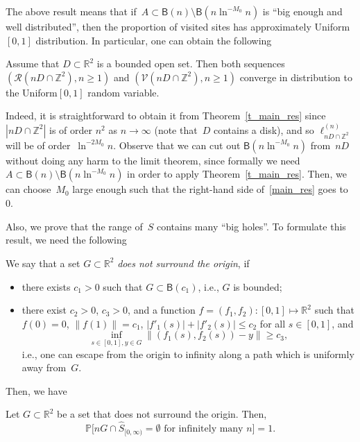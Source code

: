 \documentclass[AHL,Unicode,longabstracts]{cedram}
\newcommand{\1}[1]{{\mathbf 1}{\{#1\}}}
\newcommand{\Z}{\mathbb{Z}}
\newcommand{\V}{{\mathcal V}}
\newcommand{\RR}{{\mathcal R}}
\newcommand{\R}{{\mathbb R}}
\newcommand{\s}{{\widehat S}}
\newcommand{\8}{{\infty}}
\newcommand{\IP}{{\mathbb P}}
\newcommand{\B}{{\mathsf B}}
\begin{document}
The above result means that if~$A\subset \B(n)\setminus \B(n\ln^{-M_0}n)$ is ``big enough and well distributed'', then the proportion of visited sites has approximately Uniform$[0,1]$ distribution. In particular, one can obtain the following

\begin{coro}\label{cor_open}
Assume that $D\subset \R^2$ is a bounded open set. Then both sequences $(\RR(nD\cap\Z^2),n\geq 1)$ and $(\V(nD\cap\Z^2),n\geq 1)$ converge in distribution to the Uniform$[0,1]$ random variable.
\end{coro}

Indeed, it is straightforward to obtain it from Theorem~\ref{t_main_res} since $|nD\cap\Z^2|$ is of order $n^2$ as $n\to\infty$ (note that~$D$ contains a disk), and so $\ell^{(n)}_{nD\cap\Z^2}$ will be of order~$\ln^{-2M_0}n$. Observe that we can cut out $\B(n\ln^{-M_0}n)$ from~$nD$ without doing any harm to the limit theorem, since formally we need $A\subset \B(n)\setminus \B(n\ln^{-M_0}n)$ in order to apply Theorem~\ref{t_main_res}. Then, we can choose~$M_0$ large enough such that the right-hand side of~\eqref{main_res} goes to~$0$.

Also, we prove that the range of~$\s$ contains many ``big holes''. To formulate this result, we need the following

\begin{defi}\label{df_surround}
We say that a set $G\subset \R^2$ \emph{does not surround the origin}, if
\begin{itemize}
\item there exists $c_1>0$ such that $G\subset\B(c_1)$, i.e., $G$ is bounded;
\item there exist $c_2>0$, $c_3>0$, and a function $f=(f_1,f_2): [0,1]\mapsto \R^2$ such that $f(0)=0$, $\|f(1)\|= c_1$, $|f'_1(s)|+|f'_2(s)|\leq c_2$ for all $s\in [0,1]$, and
\[
\inf_{s\in[0,1], y\in G} \|(f_1(s),f_2(s))-y\|\geq c_3,
\]
i.e., one can escape from the origin to infinity along a path which is uniformly away from~$G$.
\end{itemize}
\end{defi}

Then, we have

\begin{theo}\label{t_bigholes}
Let $G\subset \R^2$ be a set that does not surround the origin. Then,
\begin{equation}\label{eq_bigholes}
\IP\big[nG\cap \s_{[0,\infty)} = \emptyset
\text{ for infinitely many }n\big] = 1.
\end{equation}
\end{theo}
\end{document}
